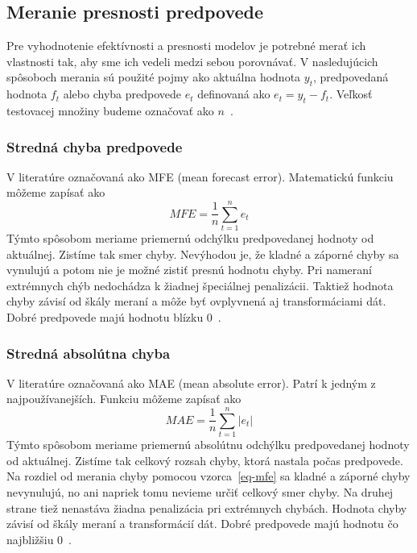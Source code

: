 \documentclass[a4paper,slovak,12pt,appendix]{article}
\begin{document}

\subsection{Meranie presnosti predpovede}
Pre vyhodnotenie efektívnosti a presnosti modelov je potrebné merať ich
vlastnosti tak, aby sme ich vedeli medzi sebou porovnávať. V nasledujúcich
spôsoboch merania sú použité pojmy ako aktuálna hodnota $y_t$, predpovedaná
hodnota $f_t$ alebo chyba predpovede $e_t$ definovaná ako $e_t = y_t - f_t$.
Veľkosť testovacej množiny budeme označovať ako $n$~\cite{Agrawal2013}.

\subsubsection{Stredná chyba predpovede}
V literatúre označovaná ako MFE (mean forecast error). Matematickú funkciu
môžeme zapísať ako
\begin{equation}
  MFE = \frac{1}{n} \sum_{t=1}^{n} e_t
  \label{eq-mfe}
\end{equation}
Týmto spôsobom meriame priemernú odchýlku predpovedanej hodnoty od aktuálnej.
Zistíme tak smer chyby. Nevýhodou je, že kladné a záporné chyby sa vynulujú
a potom nie je možné zistiť presnú hodnotu chyby. Pri nameraní extrémnych chýb
nedochádza k žiadnej špeciálnej penalizácii. Taktiež hodnota chyby závisí od škály
meraní a môže byť ovplyvnená aj transformáciami dát. Dobré predpovede majú
hodnotu blízku 0~\cite{Agrawal2013}.

\subsubsection{Stredná absolútna chyba}
V literatúre označovaná ako MAE (mean absolute error). Patrí k jedným
z najpoužívanejších. Funkciu môžeme zapísať ako
\begin{equation}
  MAE = \frac{1}{n} \sum_{t=1}^{n} |e_t|
  \label{eq-mae}
\end{equation}
Týmto spôsobom meriame priemernú absolútnu odchýlku predpovedanej hodnoty od
aktuálnej. Zistíme tak celkový rozsah chyby, ktorá nastala počas predpovede.
Na rozdiel od merania chyby pomocou vzorca~\ref{eq-mfe} sa kladné a záporné
chyby nevynulujú, no ani napriek tomu nevieme určiť celkový smer chyby.
Na druhej strane tiež nenastáva žiadna penalizácia pri extrémnych chybách.
Hodnota chyby závisí od škály meraní a transformácií dát. Dobré predpovede majú
hodnotu čo najbližšiu 0~\cite{Agrawal2013, Gutierrez2015}.
\end{document}
